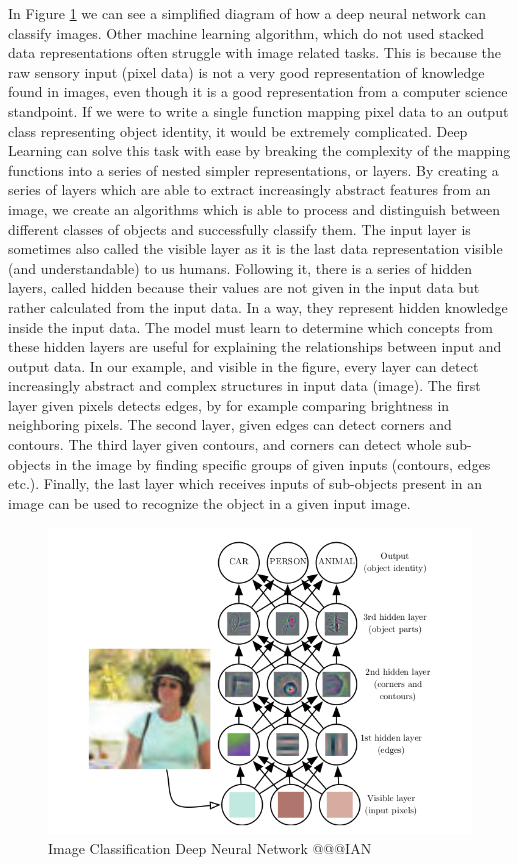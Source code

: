 \documentclass[b5paper]{book}
\begin{document}
In Figure \ref{fig:dnn_classify} we can see a simplified diagram of how a deep neural network can classify images. Other machine learning algorithm, which do not used stacked data representations often struggle with image related tasks. This is because the raw sensory input (pixel data) is not a very good representation of knowledge found in images, even though it is a good representation from a computer science standpoint. If we were to write a single function mapping pixel data to an output class representing object identity, it would be extremely complicated. Deep Learning can solve this task with ease by breaking the complexity of the mapping functions into a series of nested simpler representations, or layers. By creating a series of layers which are able to extract increasingly abstract features from an image, we create an algorithms which is able to process and distinguish between different classes of objects and successfully classify them. The input layer is sometimes also called the visible layer as it is the last data representation visible (and understandable) to us humans. Following it, there is a series of hidden layers, called hidden because their values are not given in the input data but rather calculated from the input data. In a way, they represent hidden knowledge inside the input data. The model must learn to determine which concepts from these hidden layers are useful for explaining the relationships between input and output data. In our example, and visible in the figure, every layer can detect increasingly abstract and complex structures in input data (image). The first layer given pixels detects edges, by for example comparing brightness in neighboring pixels. The second layer, given edges can detect corners and contours. The third layer given contours, and corners can detect whole sub-objects in the image by finding specific groups of given inputs (contours, edges etc.). Finally, the last layer which receives inputs of sub-objects present in an image can be used to recognize the object in a given input image.

\begin{figure}
    \centering
    \includegraphics[scale=0.5]{figures/image-classification.png}
    \caption{Image Classification Deep Neural Network @@@IAN}
    \label{fig:dnn_classify}
\end{figure}
\end{document}
